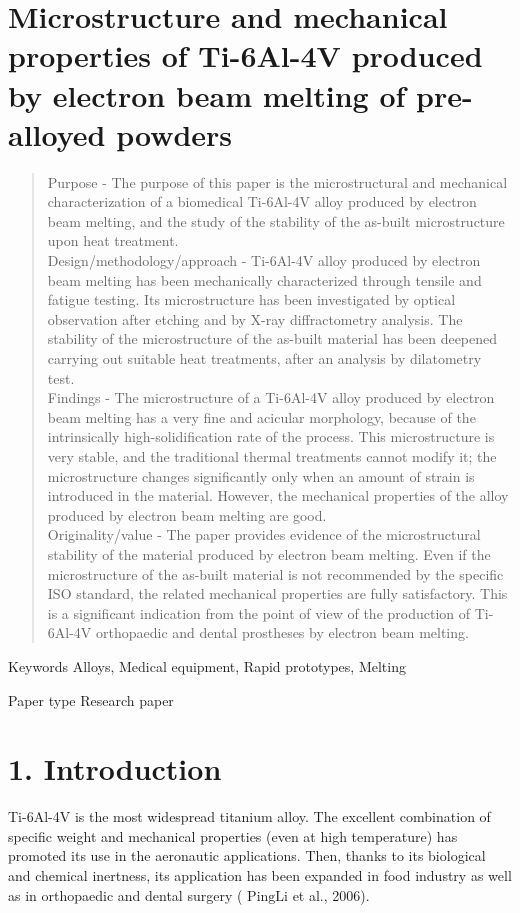 \documentclass[10pt]{article}
\begin{document}
\section*{Microstructure and mechanical properties of Ti-6Al-4V produced by electron beam melting of pre-alloyed powders }


\begin{abstract}
Purpose - The purpose of this paper is the microstructural and mechanical characterization of a biomedical Ti-6Al-4V alloy produced by electron beam melting, and the study of the stability of the as-built microstructure upon heat treatment.\\
Design/methodology/approach - Ti-6Al-4V alloy produced by electron beam melting has been mechanically characterized through tensile and fatigue testing. Its microstructure has been investigated by optical observation after etching and by X-ray diffractometry analysis. The stability of the microstructure of the as-built material has been deepened carrying out suitable heat treatments, after an analysis by dilatometry test.\\
Findings - The microstructure of a Ti-6Al-4V alloy produced by electron beam melting has a very fine and acicular morphology, because of the intrinsically high-solidification rate of the process. This microstructure is very stable, and the traditional thermal treatments cannot modify it; the microstructure changes significantly only when an amount of strain is introduced in the material. However, the mechanical properties of the alloy produced by electron beam melting are good.\\
Originality/value - The paper provides evidence of the microstructural stability of the material produced by electron beam melting. Even if the microstructure of the as-built material is not recommended by the specific ISO standard, the related mechanical properties are fully satisfactory. This is a significant indication from the point of view of the production of Ti-6Al-4V orthopaedic and dental prostheses by electron beam melting.
\end{abstract}

Keywords Alloys, Medical equipment, Rapid prototypes, Melting

Paper type Research paper

\section*{1. Introduction}
Ti-6Al-4V is the most widespread titanium alloy. The excellent combination of specific weight and mechanical properties (even at high temperature) has promoted its use in the aeronautic applications. Then, thanks to its biological and chemical inertness, its application has been expanded in food industry as well as in orthopaedic and dental surgery ( $\mathrm{Ping} \mathrm{Li}$ et al., 2006).
\end{document}
